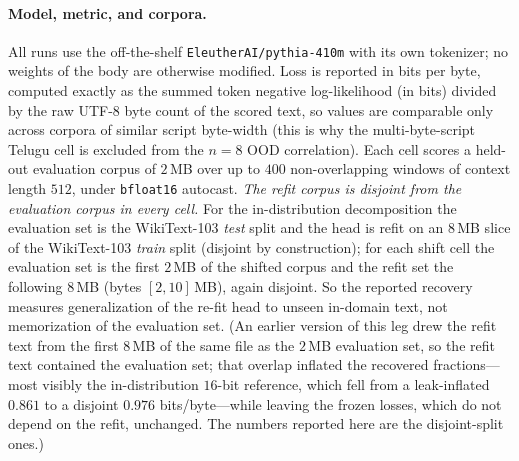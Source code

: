 \documentclass[twocolumn,10pt]{article}
\theoremstyle{definition}
\theoremstyle{remark}
\begin{document}
\paragraph{Model, metric, and corpora.} All runs use the off-the-shelf
\texttt{EleutherAI/pythia-410m} with its own tokenizer; no weights of
the body are otherwise modified. Loss is reported in bits per byte,
computed exactly as the summed token negative log-likelihood (in bits)
divided by the raw UTF-8 byte count of the scored text, so values are
comparable only across corpora of similar script byte-width (this is
why the multi-byte-script Telugu cell is excluded from the $n = 8$
OOD correlation). Each cell scores a held-out evaluation corpus of
$2$\,MB over up to $400$ non-overlapping windows of context length
$512$, under \texttt{bfloat16} autocast. \emph{The refit corpus is
disjoint from the evaluation corpus in every cell.} For the
in-distribution decomposition the evaluation set is the WikiText-103
\emph{test} split and the head is refit on an $8$\,MB slice of the
WikiText-103 \emph{train} split (disjoint by construction); for each
shift cell the evaluation set is the first $2$\,MB of the shifted corpus
and the refit set the following $8$\,MB (bytes $[2,10]$\,MB), again
disjoint. So the reported recovery measures generalization of the
re-fit head to unseen in-domain text, not memorization of the
evaluation set. (An earlier version of this leg drew the refit text
from the first $8$\,MB of the same file as the $2$\,MB evaluation set,
so the refit text contained the evaluation set; that overlap inflated
the recovered fractions---most visibly the in-distribution
$16$-bit reference, which fell from a leak-inflated $0.861$ to a
disjoint $0.976$ bits/byte---while leaving the frozen losses, which do
not depend on the refit, unchanged. The numbers reported here are the
disjoint-split ones.)
\end{document}
